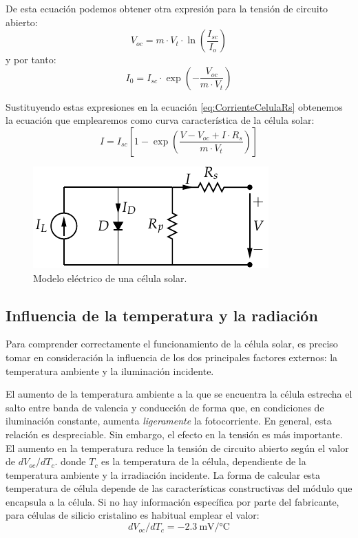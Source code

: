 De esta ecuación podemos obtener otra expresión para la tensión de
circuito abierto:\begin{equation}
V_{oc}=m\cdot V_{t}\cdot\ln(\frac{I_{sc}}{I_{o}})\end{equation}
y por tanto:\begin{equation}
I_{0}=I_{sc}\cdot\exp(-\frac{V_{oc}}{m\cdot V_{t}})\end{equation}


Sustituyendo estas expresiones en la ecuación \ref{eq:CorrienteCelulaRs}
obtenemos la ecuación que emplearemos como curva característica de
la célula solar: \begin{equation}
I=I_{sc}[1-\exp(\frac{V-V_{oc}+I\cdot R_{s}}{m\cdot V_{t}})]\label{eq:EcuacionCelulaFinal}\end{equation}
%
\begin{figure}
\includegraphics{../figs/ModeloElectricoCelulaSolar}\caption{Modelo eléctrico de una célula solar.\label{fig:M=0000F3deloCelula}}

\end{figure}



\subsection{Influencia de la temperatura y la radiación}

Para comprender correctamente el funcionamiento de la célula solar,
es preciso tomar en consideración la influencia de los dos principales
factores externos: la temperatura ambiente y la iluminación incidente.

El aumento de la temperatura ambiente a la que se encuentra la célula
estrecha el salto entre banda de valencia y conducción de forma que,
en condiciones de iluminación constante, aumenta \emph{ligeramente}
la fotocorriente. En general, esta relación es despreciable. Sin embargo,
el efecto en la tensión es más importante. El aumento en la temperatura
reduce la tensión de circuito abierto según el valor de
$dV_{oc}/dT_{c}$. 
donde $T_{c}$ es la temperatura de la célula, dependiente de la temperatura
ambiente y la irradiación incidente. La forma de calcular esta temperatura
de célula depende de las características constructivas del módulo
que encapsula a la célula. Si no hay información específica por parte del
fabricante, para células de silicio cristalino es habitual emplear el valor:
\begin{equation}
dV_{oc}/dT_{c} = \SI{-2.3}{\milli\volt\per\celsius}
\label{eq:VocTemperatura}
\end{equation}


